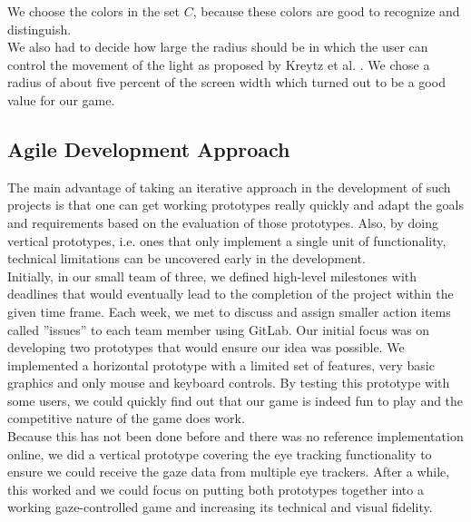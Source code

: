 \documentclass{sigchi}
\begin{document}
We choose the colors in the set $C$, because these colors are good to recognize and distinguish.\\
We also had to decide how large the radius should be in which the user can control the movement of the light as proposed by Kreytz et al. \cite{krejtz2014gaze}. We chose a radius of about five percent of the screen width which turned out to be a good value for our game.

\subsection{Agile Development Approach}
The main advantage of taking an iterative approach in the development of such projects is that one can get working prototypes really quickly and adapt the goals and requirements based on the evaluation of those prototypes. Also, by doing vertical prototypes, i.e. ones that only implement a single unit of functionality, technical limitations can be uncovered early in the development.\\
Initially, in our small team of three, we defined high-level milestones with deadlines that would eventually lead to the completion of the project within the given time frame. Each week, we met to discuss and assign smaller action items called ''issues'' to each team member using GitLab. Our initial focus was on developing two prototypes that would ensure our idea was possible. We implemented a horizontal prototype with a limited set of features, very basic graphics and only mouse and keyboard controls. By testing this prototype with some users, we could quickly find out that our game is indeed fun to play and the competitive nature of the game does work.\\
Because this has not been done before and there was no reference implementation online, we did a vertical prototype covering the eye tracking functionality to ensure we could receive the gaze data from multiple eye trackers. After a while, this worked and we could focus on putting both prototypes together into a working gaze-controlled game and increasing its technical and visual fidelity.
\end{document}
